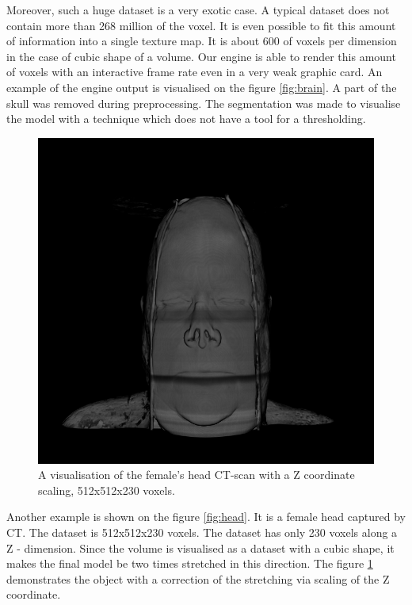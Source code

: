 \documentclass[twoside, english, 11pt]{report}
\begin{document}
Moreover, such a huge dataset is a very exotic case. A typical dataset does not contain more than 268 million of the voxel. It is even possible to fit this amount of information into a single texture map. It is about 600 of voxels per dimension in the case of cubic shape of a volume. Our engine is able to render this amount of voxels with an interactive frame rate even in a very weak graphic card. An example of the engine output is visualised on the figure \ref{fig:brain}. A part of the skull was removed during preprocessing. The segmentation was made to visualise the model with a technique which does not have a tool for a thresholding.\\


\begin{figure}[H]
\centerline{\includegraphics[scale = 0.65]{img/head-zcor}}
\caption{A visualisation of the female's head CT-scan with a Z coordinate scaling, 512x512x230 voxels.\label{fig:head-zcor}}
\end{figure}
Another example is shown on the figure \ref{fig:head}. It is a female head captured by CT. The dataset is 512x512x230 voxels. The dataset has only 230 voxels along a Z - dimension. Since the volume is visualised as a dataset with a cubic shape, it makes the final model be two times stretched in this direction. The figure \ref{fig:head-zcor} demonstrates the object with a correction of the stretching via scaling of the Z coordinate.\\
\end{document}
